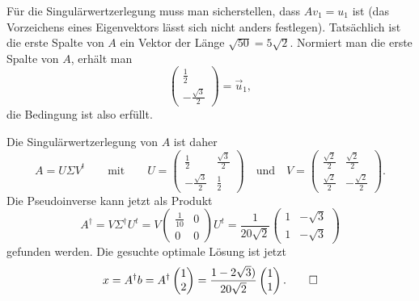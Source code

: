 \begin{loesung}
Für die Singulärwertzerlegung muss man sicherstellen, dass $Av_1=u_1$ ist
(das Vorzeichens eines Eigenvektors lässt sich nicht anders festlegen).
Tatsächlich ist die erste Spalte von $A$ ein Vektor der Länge
$\sqrt{50}=5\sqrt{2}$.
Normiert man die erste Spalte von $A$, erhält man
\[
\begin{pmatrix}
\frac{1}{2}\\-\frac{\sqrt{3}}2 
\end{pmatrix}
=
\vec{u}_1,
\]
die Bedingung ist also erfüllt.

Die Singulärwertzerlegung von $A$ ist daher
\[
A
=
U\Sigma V^t
\qquad\text{mit}\qquad
U
=
\begin{pmatrix}
\frac{1}{2}         & \frac{\sqrt{3}}{2} \\
-\frac{\sqrt{3}}{2} & \frac{1}{2}       
\end{pmatrix}
\quad \text{und}\quad
V
=
\begin{pmatrix}
\frac{\sqrt{2}}2 & \frac{\sqrt{2}}2 \\
\frac{\sqrt{2}}2 &-\frac{\sqrt{2}}2
\end{pmatrix}.
\]
Die Pseudoinverse kann jetzt als Produkt
\[
A^\dagger
=
V\Sigma^\dagger U^t
=
V\begin{pmatrix}
\frac{1}{10} & 0 \\
      0      & 0
\end{pmatrix} U^t
=
\frac{1}{20\sqrt{2}}
\begin{pmatrix}
1&-\sqrt{3}\\
1&-\sqrt{3}
\end{pmatrix}
\]
gefunden werden.
Die gesuchte optimale Lösung  ist jetzt
\[
x
=
A^\dagger b
=
A^\dagger \begin{pmatrix}1\\2\end{pmatrix}
=
\frac{1-2\sqrt{3})}{20\sqrt{2}}
\begin{pmatrix}
1\\1
\end{pmatrix}.
\qedhere
\]
\end{loesung}

